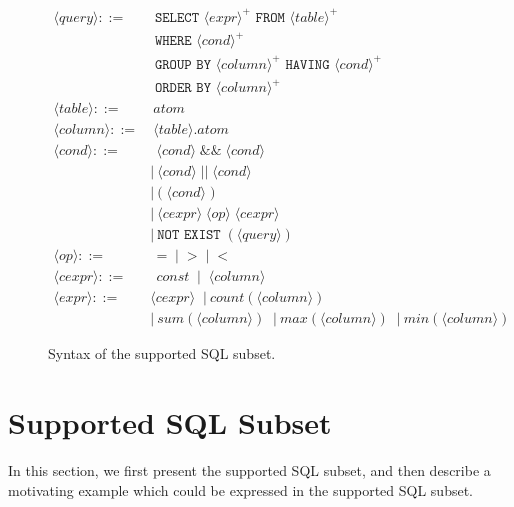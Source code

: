\newcommand{\q}{\langle query\rangle}
\newcommand{\db}{\langle db\rangle}
\newcommand{\pat}{\langle pat\rangle}
\newcommand{\bug}{\langle bug\rangle}
\newcommand{\dist}{\langle distance\rangle}
\newcommand{\sem}[1]{\llbracket #1\rrbracket}
\newcommand{\lit}[1]{\texttt{#1}}

\newcommand{\column}{\langle column\rangle}
\newcommand{\dbtable}{\langle table\rangle}
\newcommand{\cond}{\langle cond\rangle}
\newcommand{\op}{\langle op\rangle}
\newcommand{\e}{\langle expr\rangle}
\newcommand{\ce}{\langle cexpr\rangle}

\begin{figure}[t]
\footnotesize%
\begin{align*}
\q ::= {} 
	& \texttt{ SELECT } \e^+ \texttt{ FROM } \dbtable^+ \\
        & \texttt{ WHERE } \cond^+ \\ 
	&  \texttt{ GROUP BY } \column^+ \texttt{ HAVING } \cond^+\\
	&  \texttt{ ORDER BY } \column^+ \\
\dbtable::= {} &\ atom \\
\column ::= {} &\ \dbtable.atom\\
\cond ::= {} &\ \ \cond \;\texttt{\&\&}\; \cond \\ 
    & |\ \cond \;\texttt{||}\; \cond \\
    & |\ \texttt{(}\;\cond\;\texttt{)} \\
    & |\ \ce \;\op\; \ce \\
    & |\ \texttt{NOT EXIST} \;(\q) \\
\op ::= {} &\ \ \texttt{=} \;\;|\;\; \texttt{>}  \;\;|\;\; \texttt{<}\\
\ce ::= {} &\ \ const \;\;|\;\; \column  \;\; \\
\e ::= {} & \ce \;\;|\ count(\column) \\
    & |\ sum(\column) \;\;|\ max(\column) \;\;|\ min(\column) 
\end{align*}
\normalsize%
\caption{Syntax of the supported SQL subset.}
\label{fig:syntax}
\end{figure}


\section{Supported SQL Subset}
\label{sec:langsubset}

In this section, we first present the supported SQL subset, and
then describe a motivating example which could be expressed in the
supported SQL subset.

